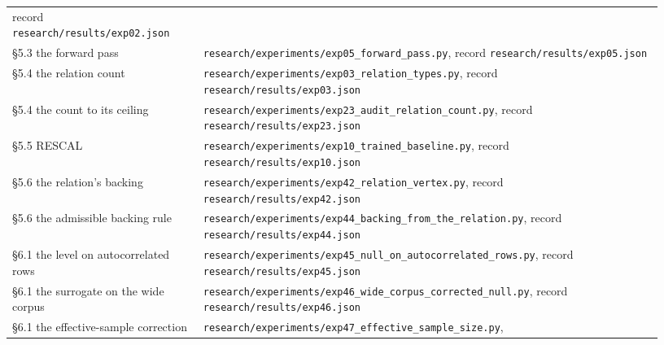 \documentclass[10pt,letterpaper,twocolumn]{article}
\begin{document}
\begin{center}
{\begin{xtabular}{L{0.276\linewidth}L{0.655\linewidth}}
record
\texttt{research/\allowbreak{}results/\allowbreak{}exp02.\allowbreak{}json} \\
§5.3 the forward pass & \texttt{research/\allowbreak{}experiments/\allowbreak{}exp05\_\allowbreak{}forward\_\allowbreak{}pass.\allowbreak{}py},
record
\texttt{research/\allowbreak{}results/\allowbreak{}exp05.\allowbreak{}json} \\
§5.4 the relation count & \texttt{research/\allowbreak{}experiments/\allowbreak{}exp03\_\allowbreak{}relation\_\allowbreak{}types.\allowbreak{}py},
record
\texttt{research/\allowbreak{}results/\allowbreak{}exp03.\allowbreak{}json} \\
§5.4 the count to its ceiling & \texttt{research/\allowbreak{}experiments/\allowbreak{}exp23\_\allowbreak{}audit\_\allowbreak{}relation\_\allowbreak{}count.\allowbreak{}py},
record
\texttt{research/\allowbreak{}results/\allowbreak{}exp23.\allowbreak{}json} \\
§5.5 RESCAL & \texttt{research/\allowbreak{}experiments/\allowbreak{}exp10\_\allowbreak{}trained\_\allowbreak{}baseline.\allowbreak{}py},
record
\texttt{research/\allowbreak{}results/\allowbreak{}exp10.\allowbreak{}json} \\
§5.6 the relation's backing & \texttt{research/\allowbreak{}experiments/\allowbreak{}exp42\_\allowbreak{}relation\_\allowbreak{}vertex.\allowbreak{}py},
record
\texttt{research/\allowbreak{}results/\allowbreak{}exp42.\allowbreak{}json} \\
§5.6 the admissible backing rule & \texttt{research/\allowbreak{}experiments/\allowbreak{}exp44\_\allowbreak{}backing\_\allowbreak{}from\_\allowbreak{}the\_\allowbreak{}relation.\allowbreak{}py},
record
\texttt{research/\allowbreak{}results/\allowbreak{}exp44.\allowbreak{}json} \\
§6.1 the level on autocorrelated rows & \texttt{research/\allowbreak{}experiments/\allowbreak{}exp45\_\allowbreak{}null\_\allowbreak{}on\_\allowbreak{}autocorrelated\_\allowbreak{}rows.\allowbreak{}py},
record
\texttt{research/\allowbreak{}results/\allowbreak{}exp45.\allowbreak{}json} \\
§6.1 the surrogate on the wide corpus & \texttt{research/\allowbreak{}experiments/\allowbreak{}exp46\_\allowbreak{}wide\_\allowbreak{}corpus\_\allowbreak{}corrected\_\allowbreak{}null.\allowbreak{}py},
record
\texttt{research/\allowbreak{}results/\allowbreak{}exp46.\allowbreak{}json} \\
§6.1 the effective-sample correction & \texttt{research/\allowbreak{}experiments/\allowbreak{}exp47\_\allowbreak{}effective\_\allowbreak{}sample\_\allowbreak{}size.\allowbreak{}py},

\end{xtabular}}
\end{center}
\end{document}
